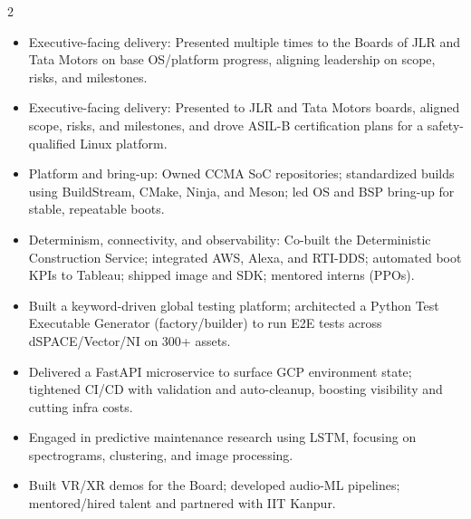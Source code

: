 \documentclass[10pt,a4paper,withhyper]{altacv}
\begin{document}
\begin{paracol}{2}
\begin{itemize}
\item Executive-facing delivery: Presented multiple times to the Boards of JLR and Tata Motors on base OS/platform progress, aligning leadership on scope, risks, and milestones.
\item Executive-facing delivery: Presented to JLR and Tata Motors boards, aligned scope, risks, and milestones, and drove ASIL-B certification plans for a safety-qualified Linux platform.
\item Platform and bring-up: Owned CCMA SoC repositories; standardized builds using BuildStream, CMake, Ninja, and Meson; led OS and BSP bring-up for stable, repeatable boots.
\item Determinism, connectivity, and observability: Co-built the Deterministic Construction Service; integrated AWS, Alexa, and RTI-DDS; automated boot KPIs to Tableau; shipped image and SDK; mentored interns (PPOs).
\end{itemize}

\divider


\begin{itemize}
\item Built a keyword-driven global testing platform; architected a Python Test Executable Generator (factory/builder) to run E2E tests across dSPACE/Vector/NI on 300+ assets.
\item Delivered a FastAPI microservice to surface GCP environment state; tightened CI/CD with validation and auto-cleanup, boosting visibility and cutting infra costs.
\end{itemize}

\divider


\begin{itemize}
\item Engaged in predictive maintenance research using LSTM, focusing on spectrograms, clustering, and image processing.
\item Built VR/XR demos for the Board; developed audio-ML pipelines; mentored/hired talent and partnered with IIT Kanpur.
\end{itemize}

\divider



\end{paracol}
\end{document}
